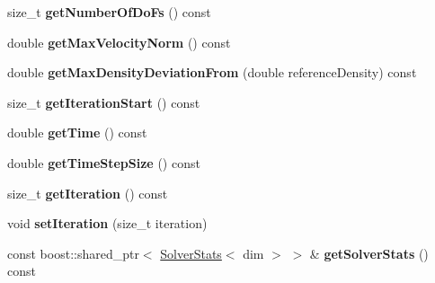\begin{DoxyCompactItemize}
\item 
\hypertarget{classnatrium_1_1CFDSolver_a74d459ef4f43d42e04ceb2178bb006f4}{
size\_\-t {\bfseries getNumberOfDoFs} () const }
\label{classnatrium_1_1CFDSolver_a74d459ef4f43d42e04ceb2178bb006f4}

\item 
\hypertarget{classnatrium_1_1CFDSolver_ae9c44bb0f33e2c73ee96fbe100061842}{
double {\bfseries getMaxVelocityNorm} () const }
\label{classnatrium_1_1CFDSolver_ae9c44bb0f33e2c73ee96fbe100061842}

\item 
\hypertarget{classnatrium_1_1CFDSolver_ade641431988a82cb47d88a9d600e1c92}{
double {\bfseries getMaxDensityDeviationFrom} (double referenceDensity) const }
\label{classnatrium_1_1CFDSolver_ade641431988a82cb47d88a9d600e1c92}

\item 
\hypertarget{classnatrium_1_1CFDSolver_a33c4bfd63b8d457a5bc15f0c0da02c38}{
size\_\-t {\bfseries getIterationStart} () const }
\label{classnatrium_1_1CFDSolver_a33c4bfd63b8d457a5bc15f0c0da02c38}

\item 
\hypertarget{classnatrium_1_1CFDSolver_a8e3686b16794c0040bd5cc7cf9fe98d3}{
double {\bfseries getTime} () const }
\label{classnatrium_1_1CFDSolver_a8e3686b16794c0040bd5cc7cf9fe98d3}

\item 
\hypertarget{classnatrium_1_1CFDSolver_a48b2fddce9c5c4375a26fed8393f1fb1}{
double {\bfseries getTimeStepSize} () const }
\label{classnatrium_1_1CFDSolver_a48b2fddce9c5c4375a26fed8393f1fb1}

\item 
\hypertarget{classnatrium_1_1CFDSolver_a3c0920e02df800abcfb8f82518cab0ca}{
size\_\-t {\bfseries getIteration} () const }
\label{classnatrium_1_1CFDSolver_a3c0920e02df800abcfb8f82518cab0ca}

\item 
\hypertarget{classnatrium_1_1CFDSolver_a97546801de9259206f9611c14ce9ff1d}{
void {\bfseries setIteration} (size\_\-t iteration)}
\label{classnatrium_1_1CFDSolver_a97546801de9259206f9611c14ce9ff1d}

\item 
\hypertarget{classnatrium_1_1CFDSolver_aa0a28a595e850dee1c40bc7ddec9b6ca}{
const boost::shared\_\-ptr$<$ \hyperlink{classnatrium_1_1SolverStats}{SolverStats}$<$ dim $>$ $>$ \& {\bfseries getSolverStats} () const }
\label{classnatrium_1_1CFDSolver_aa0a28a595e850dee1c40bc7ddec9b6ca}


\end{DoxyCompactItemize}
